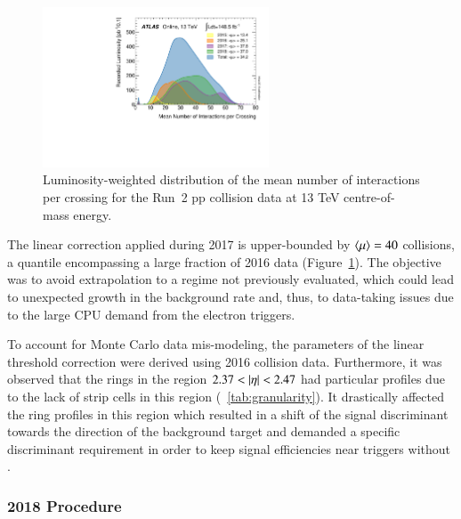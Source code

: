 








\begin{figure}[h!t]
\centering
\includegraphics[width=0.6\textwidth]{sections/tuning_strategy/figures/mu_2015_2018.pdf}
\caption{\label{fig:mu_2015_2018}
Luminosity-weighted distribution of the mean number of interactions per crossing
for the Run~2 pp collision data at 13 TeV centre-of-mass
energy.~\cite{atlas_lumi_run2_results}}
\end{figure}


The linear correction applied during 2017 is upper-bounded by $\langle \mu \rangle=40$
collisions, a quantile encompassing a large fraction of 2016 data
(Figure~\ref{fig:mu_2015_2018}). The objective was to avoid extrapolation to a
regime not previously evaluated, which could lead to unexpected growth in the
background rate and, thus, to data-taking issues due to the large CPU demand
from the electron triggers.

To account for Monte Carlo data mis-modeling, the parameters of the linear threshold
correction were derived using 2016 collision data. Furthermore, it was observed
that the rings in the region $2.37<\abseta<2.47$ had particular profiles due to
the lack of strip cells in this region (\tablename~\ref{tab:granularity}). It
drastically affected the ring profiles in this region which resulted in a shift
of the signal discriminant towards the direction of the background target and
demanded a specific discriminant requirement in order to keep signal
efficiencies near triggers without \rnn{}.

\FloatBarrier
\subsubsection{2018 Procedure}\label{ssec:2018}

